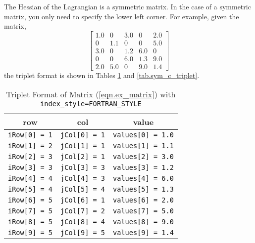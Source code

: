 \documentclass[letter,10pt]{article}
\begin{document}
The Hessian of the Lagrangian is a symmetric matrix. In the case of a
symmetric matrix, you only need to specify the lower left corner. For
example, given the matrix,
\begin{equation}
\label{eqn.ex_sym_matrix}
\left[
\begin{array}{ccccccc}
1.0	& 0	& 3.0	& 0	& 2.0 	\\
0	& 1.1	& 0	& 0	& 5.0	\\
3.0	& 0	& 1.2	& 6.0	& 0	\\
0	& 0	& 6.0	& 1.3	& 9.0	\\
2.0	& 5.0	& 0	& 9.0	& 1.4
\end{array}
\right]
\end{equation}
the triplet format is shown in Tables \ref{tab.sym_fortran_triplet}
and \ref{tab.sym_c_triplet}.
\begin{footnotesize}
\begin{table}[h]%
\begin{center}
\caption{Triplet Format of Matrix (\ref{eqn.ex_matrix}) 
with {\tt index\_style=FORTRAN\_STYLE}}
\label{tab.sym_fortran_triplet}
\begin{tabular}{c c c}
row     		&       col     	&       value 			    \\
\hline
{\tt iRow[0] = 1}       &       {\tt jCol[0] = 1}       & {\tt values[0] = 1.0}     \\
{\tt iRow[1] = 2}       &       {\tt jCol[1] = 1}       & {\tt values[1] = 1.1}     \\
{\tt iRow[2] = 3}       &       {\tt jCol[2] = 1}       & {\tt values[2] = 3.0}     \\
{\tt iRow[3] = 3}       &       {\tt jCol[3] = 3}       & {\tt values[3] = 1.2}     \\
{\tt iRow[4] = 4}       &       {\tt jCol[4] = 3}       & {\tt values[4] = 6.0}     \\
{\tt iRow[5] = 4}       &       {\tt jCol[5] = 4}       & {\tt values[5] = 1.3}     \\
{\tt iRow[6] = 5}       &       {\tt jCol[6] = 1}       & {\tt values[6] = 2.0}     \\
{\tt iRow[7] = 5}       &       {\tt jCol[7] = 2}       & {\tt values[7] = 5.0}     \\
{\tt iRow[8] = 5}       &       {\tt jCol[8] = 4}       & {\tt values[8] = 9.0}     \\
{\tt iRow[9] = 5}       &       {\tt jCol[9] = 5}       & {\tt values[9] = 1.4}
\end{tabular}
\end{center}

\end{table}
\end{footnotesize}
\end{document}

